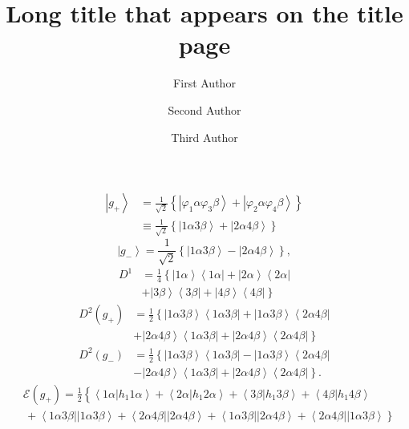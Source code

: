 \documentclass[aps,preprint]{revtex4}%
\begin{document}
\title[Short title for running header]{Long title that appears on the title page}
\author{First Author}
\author{Second Author}
\author{Third Author}


%

\begin{align*}
\left\vert g_{+}\right\rangle  & =\frac{1}{\sqrt{2}}\left\{  \left\vert
\varphi_{1}\alpha\varphi_{3}\beta\right\rangle +\left\vert \varphi_{2}%
\alpha\varphi_{4}\beta\right\rangle \right\}  \\
& \equiv\frac{1}{\sqrt{2}}\left\{  \left\vert 1\alpha3\beta\right\rangle
+\left\vert 2\alpha4\beta\right\rangle \right\}
\end{align*}%
\[
\left\vert g_{-}\right\rangle =\frac{1}{\sqrt{2}}\left\{  \left\vert
1\alpha3\beta\right\rangle -\left\vert 2\alpha4\beta\right\rangle \right\}  ,
\]%
\begin{align*}
D^{1}  & =\frac{1}{4}\left\{  \left\vert 1\alpha\right\rangle \left\langle
1\alpha\right\vert +\left\vert 2\alpha\right\rangle \left\langle
2\alpha\right\vert \right.  \\
& \left.  +\left\vert 3\beta\right\rangle \left\langle 3\beta\right\vert
+\left\vert 4\beta\right\rangle \left\langle 4\beta\right\vert \right\}
\end{align*}%
\begin{align*}
D^{2}\left(  g_{+}\right)    & =\frac{1}{2}\left\{  \left\vert 1\alpha
3\beta\right\rangle \left\langle 1\alpha3\beta\right\vert +\left\vert
1\alpha3\beta\right\rangle \left\langle 2\alpha4\beta\right\vert \right.  \\
& \left.  +\left\vert 2\alpha4\beta\right\rangle \left\langle 1\alpha
3\beta\right\vert +\left\vert 2\alpha4\beta\right\rangle \left\langle
2\alpha4\beta\right\vert \right\}
\end{align*}%
\begin{align*}
D^{2}\left(  g_{-}\right)    & =\frac{1}{2}\left\{  \left\vert 1\alpha
3\beta\right\rangle \left\langle 1\alpha3\beta\right\vert -\left\vert
1\alpha3\beta\right\rangle \left\langle 2\alpha4\beta\right\vert \right.  \\
& \left.  -\left\vert 2\alpha4\beta\right\rangle \left\langle 1\alpha
3\beta\right\vert +\left\vert 2\alpha4\beta\right\rangle \left\langle
2\alpha4\beta\right\vert \right\}  .
\end{align*}%
\begin{align*}
&  \mathcal{E}\left(  g_{+}\right)  =\frac{1}{2}\left\{  \overset
{}{\left\langle 1\alpha\left\vert h_{1}1\alpha\right.  \right\rangle
+\left\langle 2\alpha\left\vert h_{1}2\alpha\right.  \right\rangle
+\left\langle 3\beta\left\vert h_{1}3\beta\right.  \right\rangle +\left\langle
4\beta\left\vert h_{1}4\beta\right.  \right\rangle }\right.  \\
&  \left.  \,+\left\langle 1\alpha3\beta\right\vert \left\vert 1\alpha
3\beta\right\rangle +\left\langle 2\alpha4\beta\right\vert \left\vert
2\alpha4\beta\right\rangle +\left\langle 1\alpha3\beta\right\vert \left\vert
2\alpha4\beta\right\rangle +\left\langle 2\alpha4\beta\right\vert \left\vert
1\alpha3\beta\right\rangle \overset{}{}\right\}
\end{align*}%
\end{document}
